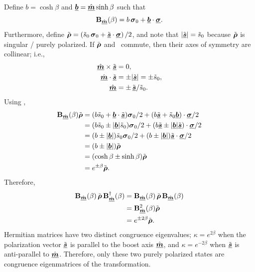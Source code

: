 Define $b=\cosh\beta$ and $\Pv{b}=\hat{\Pv{m}}\sinh\beta$ such that 
\begin{equation}
    \boost = b\,\pauli{0} + \Pv{b}\cdot\Pv{\sigma}.
\end{equation}
%
Furthermore, define 
$\tilde{\cohM{\rho}} = \left(\tilde{s}_0\,\pauli{0} + \tilde{\Pv{s}}\cdot \Pv{\sigma}\right)/2$,
and note that $|\tilde{\Pv{s}}| = \tilde{s}_0$ because $\tilde{\cohM{\rho}}$ is singular / purely polarized. 
%
If $\tilde{\cohM{\rho}}$ and \boost\ commute, then their axes of
symmetry are collinear; i.e.,
\begin{equation}
\begin{split}
\hat{\Pv{m}} \times \tilde{\Pv{s}} &= 0, \\
\hat{\Pv{m}} \cdot \tilde{\Pv{s}} &= \pm|\tilde{\Pv{s}}| = \pm\tilde{s}_0, \\
\hat{\Pv{m}} &= \pm \, \tilde{\Pv{s}} / \tilde{s}_0.
\end{split}
\end{equation}
%
Using ,
\begin{equation} \begin{split}
\boost \tilde{\cohM{\rho}} 
&= (b \tilde{s}_0 + \Pv{b} \cdot \tilde{\Pv{s}})\pauli{0}/2 + (b\tilde{\Pv{s}} + \tilde{s}_0\Pv{b})\cdot\Pv{\sigma}/2 \\
&= (b \tilde{s}_0 \pm |\Pv{b}| \tilde{s}_0)\pauli{0}/2 + (b\tilde{\Pv{s}} \pm |\Pv{b}| \tilde{\Pv{s}})\cdot\Pv{\sigma}/2 \\
&= (b \pm |\Pv{b}|) \tilde{s}_0  \pauli{0}/2 + (b \pm |\Pv{b}|) \tilde{\Pv{s}}\cdot\Pv{\sigma}/2 \\
&= (b \pm |\Pv{b}|) \tilde{\cohM{\rho}} \\
&= (\cosh\beta \pm \sinh\beta) \tilde{\cohM{\rho}} \\
&= e^{\pm\beta} \tilde{\cohM{\rho}}.
\end{split} \end{equation}
Therefore,
\begin{equation} \begin{split}
\boost \, \tilde{\cohM{\rho}} \, \vBoost^\dagger(\beta)
&= \boost \, \tilde{\cohM{\rho}} \, \boost \\
&= \vBoost^2(\beta) \tilde{\cohM{\rho}} \\
&= e^{\pm2\beta} \tilde{\cohM{\rho}}.
\end{split} \end{equation}
%
Hermitian matrices have two distinct congruence eigenvalues; 
$\kappa=e^{2\beta}$ when the polarization vector $\tilde{\Pv{s}}$
is parallel to the boost axis $\hat{\Pv{m}}$,
and
$\kappa=e^{-2\beta}$ when $\tilde{\Pv{s}}$
is anti-parallel to $\hat{\Pv{m}}$.
%
Therefore, only these two purely polarized states are congruence eigenmatrices of the transformation.


